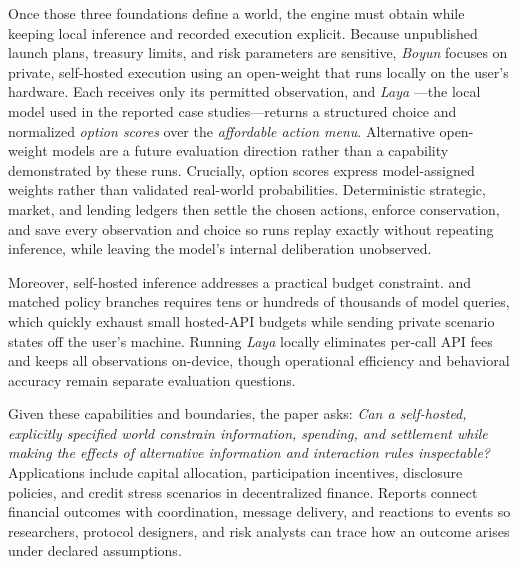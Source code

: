 Once those three foundations define a world, the engine must obtain  while keeping local inference and recorded
execution explicit. Because unpublished launch plans, treasury limits, and risk
parameters are sensitive, \textit{Boyun} focuses on private, self-hosted
execution using an open-weight  that runs
locally on the user's hardware. Each  receives only its
permitted  observation, and \textit{Laya}
\cite{layamodel}---the local  model used in the reported case
studies---returns a structured choice and normalized \textit{option scores}
over the  \textit{affordable action menu}. Alternative open-weight
models are a future evaluation direction rather than a capability demonstrated
by these runs. Crucially, option scores express model-assigned weights rather
than validated real-world probabilities. Deterministic strategic, market, and
lending ledgers then settle the chosen actions,  enforce conservation, and save every observation and choice so
runs replay exactly without repeating inference, while leaving the model's
internal deliberation unobserved.

Moreover, self-hosted inference addresses a practical budget constraint.
 and matched policy branches requires tens or hundreds of
thousands of model queries, which quickly exhaust small hosted-API budgets while
sending private scenario states off the user's machine. Running \textit{Laya}
locally eliminates per-call API fees and keeps all  observations
on-device, though operational efficiency and behavioral accuracy remain separate
evaluation questions.

Given these capabilities and boundaries, the paper asks: \emph{Can a
self-hosted, explicitly specified  world constrain
 information, spending, and settlement while making the
effects of alternative information and interaction rules inspectable?}
Applications include capital allocation, participation incentives, disclosure
policies, and credit stress scenarios in decentralized finance. Reports connect
financial outcomes  with coordination,
 message delivery, and  reactions to events so
researchers, protocol designers, and risk analysts can trace how an outcome
arises under declared assumptions.


